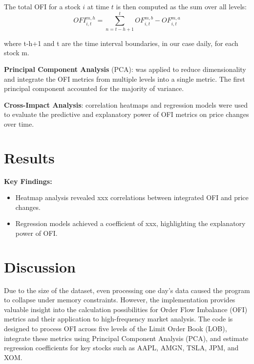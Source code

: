 \documentclass[12pt]{article}
\begin{document}
The total OFI for a stock $i$ at time $t$ is then computed as the sum over all levels:
\[
OFI_{i,t}^{m,h} = \sum_{n=t-h+1}^{t} OF_{i,t}^{m,b} - OF_{i,t}^{m,a}
\]

where t-h+1 and t are the time interval boundaries, in our case daily, for each stock m.

\textbf{Principal Component Analysis} (PCA): was applied to reduce dimensionality and integrate the OFI metrics from multiple levels into a single metric. The first principal component accounted for the majority of variance.

\textbf{Cross-Impact Analysis}: correlation heatmaps and regression models were used to evaluate the predictive and explanatory power of OFI metrics on price changes over time.


\section*{Results}
\textbf{Key Findings:}
\begin{itemize}
    \item Heatmap analysis revealed xxx correlations between integrated OFI and price changes.
    \item Regression models achieved a coefficient of xxx, highlighting the explanatory power of OFI.
\end{itemize}



\section*{Discussion}\label{sec:disc}
Due to the size of the dataset, even processing one day's data caused the program to collapse under memory constraints. However, the implementation provides valuable insight into the calculation possibilities for Order Flow Imbalance (OFI) metrics and their application to high-frequency market analysis. The code is designed to process OFI across five levels of the Limit Order Book (LOB), integrate these metrics using Principal Component Analysis (PCA), and estimate regression coefficients for key stocks such as AAPL, AMGN, TSLA, JPM, and XOM.
\end{document}
